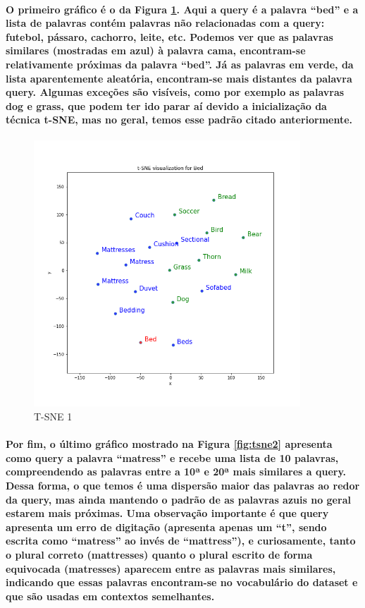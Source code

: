 \documentclass[a4paper]{article}    %
\begin{document}
\paragraph{O primeiro gráfico é o da Figura \ref{fig:tsne1}. Aqui a query é a palavra ``bed'' e a lista de palavras contém palavras não relacionadas com a query: futebol, pássaro, cachorro, leite, etc. Podemos ver que as palavras similares (mostradas em azul) à palavra cama, encontram-se relativamente próximas da palavra ``bed''. Já as palavras em verde, da lista aparentemente aleatória, encontram-se mais distantes da palavra query. Algumas exceções são visíveis, como por exemplo as palavras dog e grass, que podem ter ido parar aí devido a inicialização da técnica t-SNE, mas no geral, temos esse padrão citado anteriormente.}

\begin{figure}[H]
    \centering
    \includegraphics[width=10cm]{tsne1}
    \caption{T-SNE 1}
    \label{fig:tsne1}
\end{figure}

\paragraph{Por fim, o último gráfico mostrado na Figura \ref{fig:tsne2} apresenta como query a palavra ``matress'' e recebe uma lista de 10 palavras, compreendendo as palavras entre a 10ª e 20ª mais similares a query. Dessa forma, o que temos é uma dispersão maior das palavras ao redor da query, mas ainda mantendo o padrão de as palavras azuis no geral estarem mais próximas. Uma observação importante é que query apresenta um erro de digitação (apresenta apenas um ``t'', sendo escrita como ``matress'' ao invés de ``mattress''), e curiosamente, tanto o plural correto (mattresses) quanto o plural escrito de forma equivocada (matresses) aparecem entre as palavras mais similares, indicando que essas palavras encontram-se no vocabulário do dataset e que são usadas em contextos semelhantes.}
\end{document}
